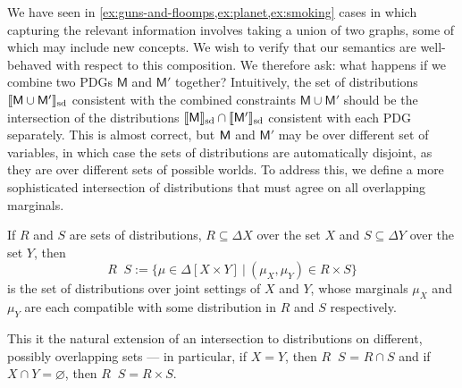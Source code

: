 \documentclass{article}
\newcommand{\notation}[2][]{#1}
\renewcommand{\notation}[2][]{{\color{notationcolor} #2}}
\DeclarePairedDelimiter{\SD}{\llbracket}{\rrbracket_{\text{sd}}}
\DeclareMathOperator\dcap{\mathop{\dot\cap}}
\newcommand{\sfM}{\mathsf M}
\numberwithin{equation}{section}
\begin{document}
	We have seen
        in \cref{ex:guns-and-floomps,ex:planet,ex:smoking} cases in
        which capturing the relevant information involves taking a
        union of two graphs, some of which may include new
        concepts. We wish to verify that our semantics are
        well-behaved with respect to this composition.	  
	We therefore ask: what happens if we combine two PDGs $\sfM$
        and $\sfM'$ together? Intuitively, the set of distributions
        $\SD{\sfM \cup \sfM'}$ consistent with the combined
        constraints $\sfM\cup \sfM'$ should be the intersection of the
        distributions $\SD{\sfM} \cap \SD{\sfM'}$ consistent
        with each PDG separately. This is almost correct, but $\sf M$
        and $\sfM'$ may be over different set of variables, in which
        case the sets of distributions are automatically disjoint, as
        they are over different sets of possible worlds. To address
        this, we define a more sophisticated intersection of
        distributions that must agree on all overlapping
        marginals. %
	
	\begin{defn}[$\dcap$]\label{def:marginal-dist-intersection}
		If $R$ and $S$ are sets of distributions, $R \subseteq \Delta X$ over the set $X$ and $S\subseteq \Delta Y$ over the set $Y$, then
			{$$R \dcap S := \Big\{ \mu \in  \Delta [X \!\times\! Y] ~\Big|~ (\mu_{X}, \mu_{Y}) \in R \times S \Big\}  $$}%
		is the set of distributions over joint settings of $X$ and $Y$, whose marginals $\mu_X$ and $\mu_Y$ are each compatible with some distribution in $R$ and $S$ respectively. 
		
		This it the natural extension of an intersection to distributions on different, possibly overlapping sets --- in particular, if $X = Y$, then $R \dcap S$ = $R \cap S$ and if \notation[$X$ and $Y$ are disjoint]{$X \cap Y = \varnothing$}, then $R \dcap S = R \times S$. 
	\end{defn}
	
\end{document}
